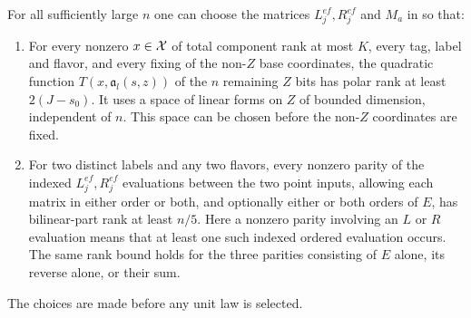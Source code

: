 \begin{lemma}\label{lem:generic-mixers}
For all sufficiently large $n$ one can choose the matrices
$L_j^{ef},R_j^{ef}$ and $M_a$ in  so that:
\begin{enumerate}[label=\textup{(\roman*)}]
\item\label{item:mixer-unary}
For every nonzero $x\in\mathcal X$ of total component rank at most $K$,
every tag, label and flavor, and every fixing of the non-$Z$
base coordinates, the quadratic function
$T(x,\mathfrak a_l(s,z))$ of the $n$ remaining $Z$ bits has polar
rank at least $2(J-s_0)$.  It uses a space of linear forms on $Z$
of bounded dimension, independent of $n$.  This space can be
chosen before the non-$Z$ coordinates are fixed.
\item\label{item:mixer-binary}
For two distinct labels and any two flavors, every nonzero parity
of the indexed $L_j^{ef},R_j^{ef}$ evaluations between the two
point inputs, allowing each matrix in either order or both,
and optionally either or both orders of $E$, has bilinear-part
rank at least $n/5$.  Here a nonzero parity involving an $L$ or
$R$ evaluation means that at least one such indexed ordered
evaluation occurs.  The same rank bound holds for the three
parities consisting of $E$ alone, its reverse alone, or their sum.
\end{enumerate}
The choices are made before any unit law is selected.
\end{lemma}
